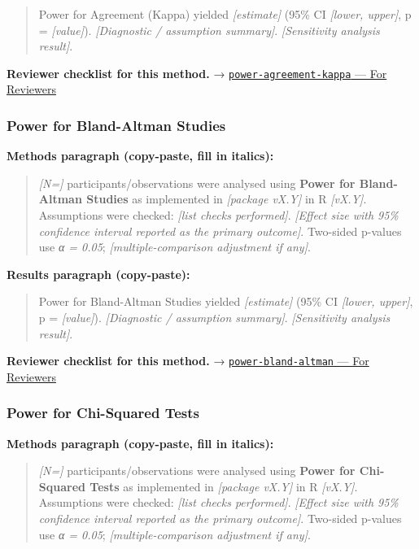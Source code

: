\documentclass[
]{article}
\begin{document}
\begin{quote}
Power for Agreement (Kappa) yielded \emph{{[}estimate{]}} (95\% CI
\emph{{[}lower, upper{]}}, p = \emph{{[}value{]}}). \emph{{[}Diagnostic
/ assumption summary{]}}. \emph{{[}Sensitivity analysis result{]}}.
\end{quote}

\textbf{Reviewer checklist for this method.} →
\href{../chapters/05-power/power-agreement-kappa.Rmd\#for-reviewers}{\texttt{power-agreement-kappa}
--- For Reviewers}

\subsubsection{Power for Bland-Altman
Studies}\label{power-for-bland-altman-studies}

\textbf{Methods paragraph (copy-paste, fill in italics):}

\begin{quote}
\emph{{[}N={]}} participants/observations were analysed using
\textbf{Power for Bland-Altman Studies} as implemented in
\emph{{[}package vX.Y{]}} in R \emph{{[}vX.Y{]}}. Assumptions were
checked: \emph{{[}list checks performed{]}}. \emph{{[}Effect size with
95\% confidence interval reported as the primary outcome{]}}. Two-sided
p-values use \emph{α = 0.05}; \emph{{[}multiple-comparison adjustment if
any{]}}.
\end{quote}

\textbf{Results paragraph (copy-paste):}

\begin{quote}
Power for Bland-Altman Studies yielded \emph{{[}estimate{]}} (95\% CI
\emph{{[}lower, upper{]}}, p = \emph{{[}value{]}}). \emph{{[}Diagnostic
/ assumption summary{]}}. \emph{{[}Sensitivity analysis result{]}}.
\end{quote}

\textbf{Reviewer checklist for this method.} →
\href{../chapters/05-power/power-bland-altman.Rmd\#for-reviewers}{\texttt{power-bland-altman}
--- For Reviewers}

\subsubsection{Power for Chi-Squared
Tests}\label{power-for-chi-squared-tests}

\textbf{Methods paragraph (copy-paste, fill in italics):}

\begin{quote}
\emph{{[}N={]}} participants/observations were analysed using
\textbf{Power for Chi-Squared Tests} as implemented in \emph{{[}package
vX.Y{]}} in R \emph{{[}vX.Y{]}}. Assumptions were checked: \emph{{[}list
checks performed{]}}. \emph{{[}Effect size with 95\% confidence interval
reported as the primary outcome{]}}. Two-sided p-values use \emph{α =
0.05}; \emph{{[}multiple-comparison adjustment if any{]}}.
\end{quote}
\end{document}
